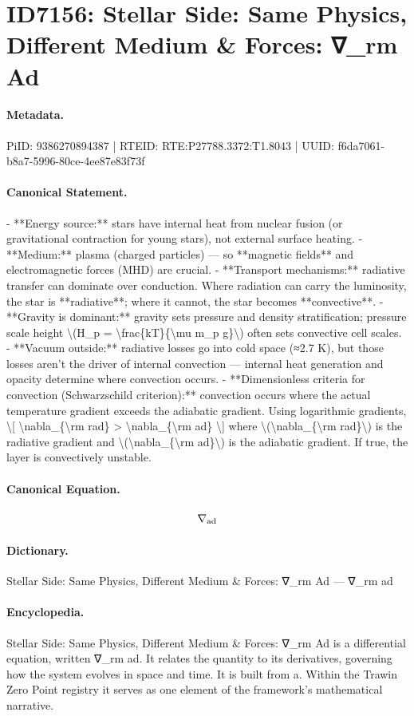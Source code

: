 \section*{ID7156: Stellar Side: Same Physics, Different Medium \& Forces: ∇\_rm Ad}
\paragraph{Metadata.}
PiID: 9386270894387 | RTEID: RTE:P27788.3372:T1.8043 | UUID: f6da7061-b8a7-5996-80ce-4ee87e83f73f

\paragraph{Canonical Statement.}
- **Energy source:** stars have internal heat from nuclear fusion (or gravitational contraction for young stars), not external surface heating. - **Medium:** plasma (charged particles) — so **magnetic fields** and electromagnetic forces (MHD) are crucial. - **Transport mechanisms:** radiative transfer can dominate over conduction. Where radiation can carry the luminosity, the star is **radiative**; where it cannot, the star becomes **convective**. - **Gravity is dominant:** gravity sets pressure and density stratification; pressure scale height \textbackslash{}(H\_p = \textbackslash{}frac\{kT\}\{\textbackslash{}mu m\_p g\}\textbackslash{}) often sets convective cell scales. - **Vacuum outside:** radiative losses go into cold space (≈2.7 K), but those losses aren’t the driver of internal convection — internal heat generation and opacity determine where convection occurs. - **Dimensionless criteria for convection (Schwarzschild criterion):** convection occurs where the actual temperature gradient exceeds the adiabatic gradient. Using logarithmic gradients, \textbackslash{}[ \textbackslash{}nabla\_\{\textbackslash{}rm rad\} > \textbackslash{}nabla\_\{\textbackslash{}rm ad\} \textbackslash{}] where \textbackslash{}(\textbackslash{}nabla\_\{\textbackslash{}rm rad\}\textbackslash{}) is the radiative gradient and \textbackslash{}(\textbackslash{}nabla\_\{\textbackslash{}rm ad\}\textbackslash{}) is the adiabatic gradient. If true, the layer is convectively unstable.

\paragraph{Canonical Equation.}
\[
\nabla_{\rm ad}
\]

\paragraph{Dictionary.}
Stellar Side: Same Physics, Different Medium \& Forces: ∇\_rm Ad — ∇\_rm ad

\paragraph{Encyclopedia.}
Stellar Side: Same Physics, Different Medium \& Forces: ∇\_rm Ad is a differential equation, written ∇\_rm ad. It relates the quantity to its derivatives, governing how the system evolves in space and time. It is built from a. Within the Trawin Zero Point registry it serves as one element of the framework's mathematical narrative.
